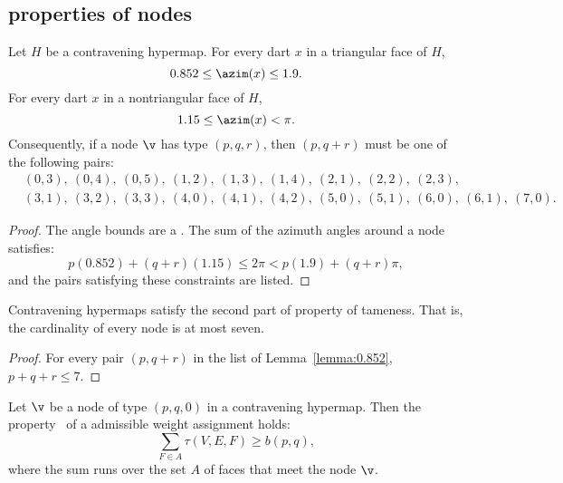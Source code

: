 \subsection{properties of nodes}
%



\begin{lemma}[] \label{lemma:0.852}
Let $H$ be a contravening
hypermap. For every dart $x$ in a triangular face of $H$,
\[ 0.852\le \azim(x)\le 1.9.\] 
For every dart $x$ in a nontriangular face of $H$, 
\[ 1.15\le\azim(x)<\pi.\] 
%
%
Consequently, if a node $\v$ has type $(p,q,r)$, then $(p,q+r)$ must
be one of the following pairs:
\begin{align*}
  &(0,3),~(0,4),~(0,5),~(1,2),~(1,3),~(1,4),~(2,1),~(2,2),~(2,3),\\
  &(3,1),~(3,2),~(3,3),~(4,0),~(4,1),~(4,2),
  ~(5,0),~(5,1),~(6,0),~(6,1),~(7,0).
\end{align*}
\end{lemma}
%

\begin{proof}
The angle bounds are a .  The sum of the azimuth angles
around a node satisfies:
\[ 
p (0.852) + (q+r) (1.15) \le 2\pi < p (1.9) + (q+r) \pi,
\] 
and the pairs satisfying these constraints are listed.
\end{proof}

\begin{lemma}[]\label{lemma:node-upper}
Contravening hypermaps satisfy the second part of property 
of tameness.  That is, the cardinality of every
node is at most seven.
\end{lemma}

\begin{proof}  For every pair $(p,q+r)$
in the list of Lemma~\ref{lemma:0.852},  $p+q+r\le 7$.
\end{proof}




\begin{lemma}[] \label{lemma:weightB}
  Let $\v$ be a node of type $(p,q,0)$ in a contravening hypermap.
  Then the property~ of a admissible weight assignment
  holds:
\[ 
\sum_{ F\in A} \tau(V,E,F) \ge  b(p,q),
\] 
where the sum runs over the set $A$ of faces that meet the node $\v$.
\end{lemma}
%
%


